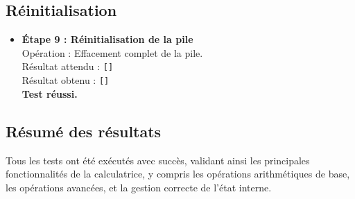 \documentclass[12pt, a4paper, onecolumn]{article}
\begin{document}
\subsection{Réinitialisation}
\begin{itemize}
	\item \textbf{Étape 9 : Réinitialisation de la pile} \\
	Opération : Effacement complet de la pile. \\
	Résultat attendu : \texttt{[]} \\
	Résultat obtenu : \texttt{[]} \\
	\textbf{Test réussi.}
\end{itemize}

\subsection{Résumé des résultats}
Tous les tests ont été exécutés avec succès, validant ainsi les principales fonctionnalités de la calculatrice, y compris les opérations arithmétiques de base, les opérations avancées, et la gestion correcte de l'état interne.
\end{document}
